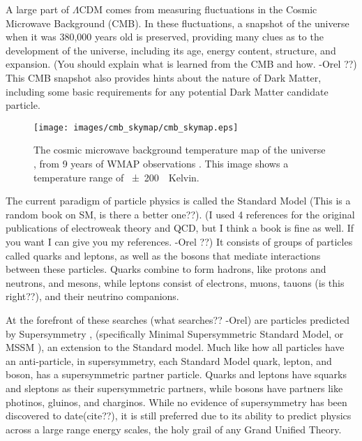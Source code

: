   A large part of $\Lambda$CDM comes from measuring fluctuations in the Cosmic Microwave Background (CMB).
  In these fluctuations, a snapshot of the universe when it was 380,000 years old is preserved, providing many clues as to the development of the universe, including its age, energy content, structure, and expansion. 
  {\color{red}(You should explain what is learned from the CMB and how. -Orel ??)}
  This CMB snapshot also provides hints about the nature of Dark Matter, including some basic requirements for any potential Dark Matter candidate particle.

  \begin{figure}[ht]
    \texttt{[image: images/cmb\_skymap/cmb\_skymap.eps]}
    \caption[The Cosmic Microwave Background]{
      The cosmic microwave background temperature map of the universe \cite{wmap_skymap}, from 9 years of WMAP observations \cite{wmap9year}.
      This image shows a temperature range of \SI{\pm200}{\mu{}Kelvin}.
    }
    \label{fig:cmb}
  \end{figure}

  The current paradigm of particle physics is called the Standard Model \cite{standardmodel} {\color{red}(This is a random book on SM, is there a better one??)}.
  {\color{red}(I used 4 references for the original publications of electroweak theory and QCD, but I think a book is fine as well. If you want I can give you my references. -Orel ??)}
  It consists of groups of particles called quarks and leptons, as well as the bosons that mediate interactions between these particles.
  Quarks combine to form hadrons, like protons and neutrons, and mesons, while leptons consist of electrons, muons, {\color{red}tauons (is this right??)}, and their neutrino companions.

  At the forefront of {\color{red}these searches (what searches?? -Orel)} are particles predicted by Supersymmetry \cite{Jungman:1995df}, (specifically Minimal Supersymmetric Standard Model, or MSSM \cite{MSSM}), an extension to the Standard model.
  Much like how all particles have an anti-particle, in supersymmetry, each Standard Model quark, lepton, and boson, has a supersymmetric partner particle.
  Quarks and leptons have squarks and sleptons as their supersymmetric partners, while bosons have partners like photinos, gluinos, and charginos.
  While no evidence of supersymmetry has been discovered to date{\color{red}(cite??)}, it is still preferred due to its ability to predict physics across a large range energy scales, the holy grail of any Grand Unified Theory.
  

